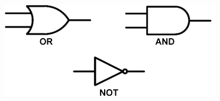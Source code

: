 \begin{frame}
\begin{columns}
		\begin{figure}[!htbp]
			\centering
			\advance\rightskip-0.25cm
			\includegraphics[width=1.0\linewidth]{images/1_i_sistemi/ports.png}
		\end{figure}
	\end{columns}
		
		
	
	
	
\end{frame}




